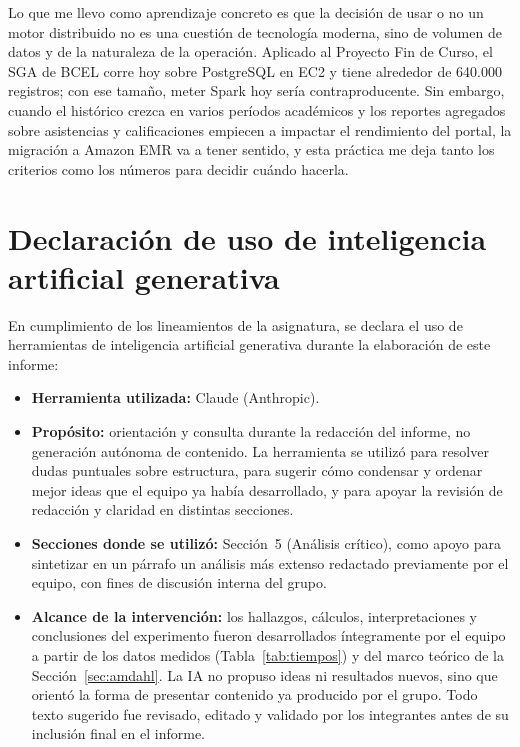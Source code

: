 \documentclass[11pt,a4paper]{article}
\begin{document}
Lo que me llevo como aprendizaje concreto es que la decisión de usar o no un motor distribuido no es una cuestión de tecnología moderna, sino de volumen de datos y de la naturaleza de la operación. Aplicado al Proyecto Fin de Curso, el SGA de BCEL corre hoy sobre PostgreSQL en EC2 y tiene alrededor de 640.000 registros; con ese tamaño, meter Spark hoy sería contraproducente. Sin embargo, cuando el histórico crezca en varios períodos académicos y los reportes agregados sobre asistencias y calificaciones empiecen a impactar el rendimiento del portal, la migración a Amazon EMR va a tener sentido, y esta práctica me deja tanto los criterios como los números para decidir cuándo hacerla.


\section{Declaración de uso de inteligencia artificial generativa}

En cumplimiento de los lineamientos de la asignatura, se declara el uso de
herramientas de inteligencia artificial generativa durante la elaboración de
este informe:

\begin{itemize}
  \item \textbf{Herramienta utilizada:} Claude (Anthropic).
  \item \textbf{Propósito:} orientación y consulta durante la redacción del
        informe, no generación autónoma de contenido. La herramienta se
        utilizó para resolver dudas puntuales sobre estructura, para
        sugerir cómo condensar y ordenar mejor ideas que el equipo ya había
        desarrollado, y para apoyar la revisión de redacción y claridad en
        distintas secciones.
  \item \textbf{Secciones donde se utilizó:} Sección~5 (Análisis crítico),
        como apoyo para sintetizar en un párrafo un análisis más extenso
        redactado previamente por el equipo, con fines de discusión interna
        del grupo.
  \item \textbf{Alcance de la intervención:} los hallazgos, cálculos,
        interpretaciones y conclusiones del experimento fueron desarrollados
        íntegramente por el equipo a partir de los datos medidos
        (Tabla~\ref{tab:tiempos}) y del marco teórico de la
        Sección~\ref{sec:amdahl}. La IA no propuso ideas ni resultados
        nuevos, sino que orientó la forma de presentar contenido ya
        producido por el grupo. Todo texto sugerido fue revisado, editado y
        validado por los integrantes antes de su inclusión final en el
        informe.
\end{itemize}

\newpage
\printbibliography
\end{document}
